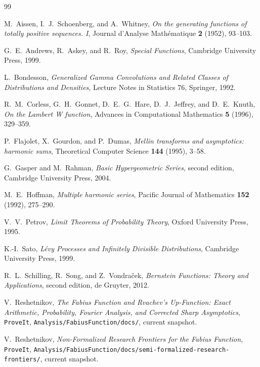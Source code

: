 \documentclass[11pt]{article}
\numberwithin{equation}{section}
\theoremstyle{definition}
\theoremstyle{remark}
\begin{document}
\begin{thebibliography}{99}

M.~Aissen, I.~J.~Schoenberg, and A.~Whitney,
\emph{On the generating functions of totally positive sequences. I},
Journal d'Analyse Math\'ematique \textbf{2} (1952), 93--103.

G.~E.~Andrews, R.~Askey, and R.~Roy,
\emph{Special Functions}, Cambridge University Press, 1999.

L.~Bondesson,
\emph{Generalized Gamma Convolutions and Related Classes of Distributions and
Densities}, Lecture Notes in Statistics 76, Springer, 1992.

R.~M.~Corless, G.~H.~Gonnet, D.~E.~G.~Hare, D.~J.~Jeffrey, and D.~E.~Knuth,
\emph{On the Lambert W function}, Advances in Computational Mathematics
\textbf{5} (1996), 329--359.

P.~Flajolet, X.~Gourdon, and P.~Dumas,
\emph{Mellin transforms and asymptotics: harmonic sums},
Theoretical Computer Science \textbf{144} (1995), 3--58.

G.~Gasper and M.~Rahman,
\emph{Basic Hypergeometric Series}, second edition, Cambridge University Press,
2004.

M.~E.~Hoffman,
\emph{Multiple harmonic series}, Pacific Journal of Mathematics
\textbf{152} (1992), 275--290.

V.~V.~Petrov,
\emph{Limit Theorems of Probability Theory}, Oxford University Press, 1995.

K.-I.~Sato,
\emph{L\'evy Processes and Infinitely Divisible Distributions},
Cambridge University Press, 1999.

R.~L.~Schilling, R.~Song, and Z.~Vondra\v{c}ek,
\emph{Bernstein Functions: Theory and Applications}, second edition,
de Gruyter, 2012.

V.~Reshetnikov,
\emph{The Fabius Function and Rvachev's Up-Function: Exact Arithmetic,
Probability, Fourier Analysis, and Corrected Sharp Asymptotics},
\texttt{ProveIt}, \nolinkurl{Analysis/FabiusFunction/docs/}, current snapshot.

V.~Reshetnikov,
\emph{Non-Formalized Research Frontiers for the Fabius Function},
\texttt{ProveIt}, \nolinkurl{Analysis/FabiusFunction/docs/semi-formalized-research-frontiers/},
current snapshot.

\end{thebibliography}
\end{document}
